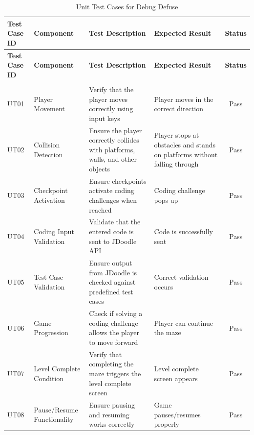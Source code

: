 \begin{longtable}{|p{1.5cm}|p{2.5cm}|p{4cm}|p{4cm}|c|}
    
    \hline
    \textbf{Test Case ID} & \textbf{Component} & \textbf{Test Description} & \textbf{Expected Result} & \textbf{Status} \\
    \hline
    \endfirsthead

    \hline
    \textbf{Test Case ID} & \textbf{Component} & \textbf{Test Description} & \textbf{Expected Result} & \textbf{Status} \\
    \hline
    \endhead

    \hline
    
    \endfoot

    \hline
    \caption{Unit Test Cases for Debug Defuse} \label{tab:unit_tests} \\
    \endlastfoot

    UT01 & Player Movement & \raggedright Verify that the player moves correctly using input keys & \raggedright Player moves in the correct direction & Pass \\
    \hline
    UT02 & Collision Detection & \raggedright Ensure the player correctly collides with platforms, walls, and other objects & \raggedright Player stops at obstacles and stands on platforms without falling through & Pass \\
    \hline
    UT03 & Checkpoint Activation & \raggedright Ensure checkpoints activate coding challenges when reached & \raggedright Coding challenge pops up & Pass \\
    \hline
    UT04 & Coding Input Validation & \raggedright Validate that the entered code is sent to JDoodle API & \raggedright Code is successfully sent & Pass \\
    \hline
    UT05 & Test Case Validation & \raggedright Ensure output from JDoodle is checked against predefined test cases & \raggedright Correct validation occurs & Pass \\
    \hline
    UT06 & Game Progression & \raggedright Check if solving a coding challenge allows the player to move forward & \raggedright Player can continue the maze & Pass \\
    \hline
    UT07 & Level Complete Condition & \raggedright Verify that completing the maze triggers the level complete screen & \raggedright Level complete screen appears & Pass \\
    \hline
    UT08 & Pause/Resume Functionality & \raggedright Ensure pausing and resuming works correctly & \raggedright Game pauses/resumes properly & Pass \\
    \end{longtable}







